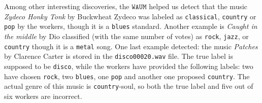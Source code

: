 Among other interesting discoveries, the $\texttt{WAUM}$ helped us detect that the music \emph{Zydeco Honky Tonk} by Buckwheat Zydeco was labeled as \texttt{classical}, \texttt{country} or \texttt{pop} by the workers, though it is a \texttt{blues} standard.
Another example is \emph{Caught in the middle} by Dio classified (with the same number of votes) as \texttt{rock}, \texttt{jazz}, or \texttt{country} though it is a \texttt{metal} song.
One last example detected: the music \emph{Patches} by Clarence Carter is stored in the \texttt{disco00020.wav} file.
The true label is supposed to be \texttt{disco}, while the workers have provided the following labels: two have chosen \texttt{rock}, two \texttt{blues}, one \texttt{pop} and another one proposed \texttt{country}.
The actual genre of this music is \texttt{country}-soul, so both the true label and five out of six workers are incorrect.


